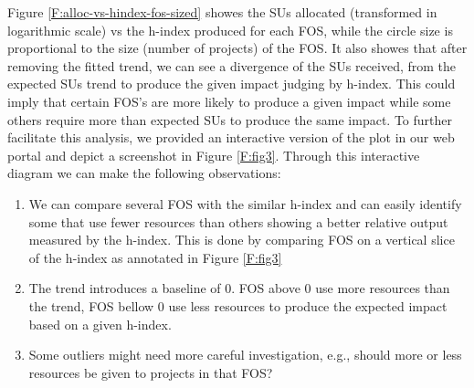 \documentclass{sig-alternate}
\begin{document}
Figure \ref{F:alloc-vs-hindex-fos-sized} showes the SUs allocated (transformed in logarithmic scale) vs the h-index produced for each FOS, while the circle size is proportional to the size (number of projects) of the FOS. It also showes that after removing the fitted trend, we can see a divergence of the SUs received, from the expected SUs trend to produce the given impact judging by h-index. This could imply that certain FOS’s are more likely to produce a given impact while some others require more than expected SUs to produce the same impact. To further facilitate this analysis, we provided an interactive version of the plot in our web portal and depict a screenshot in Figure \ref{F:fig3}. Through this interactive diagram we can make the following observations: 
 
\begin{enumerate} 
 
\item We can compare several FOS with the similar h-index and can easily identify some that use fewer resources than others showing a better relative output measured by the h-index. This is done by comparing FOS on a vertical slice of the h-index as annotated in Figure \ref{F:fig3} 
 
\item The trend introduces a baseline of 0. FOS above 0 use more resources than the trend, FOS bellow 0 use less resources to produce the expected impact based on a given h-index. 
 
\item Some outliers might need more careful investigation, e.g., should more or less resources be given to projects in that FOS? 
 
\end{enumerate} 
 
\end{document}
